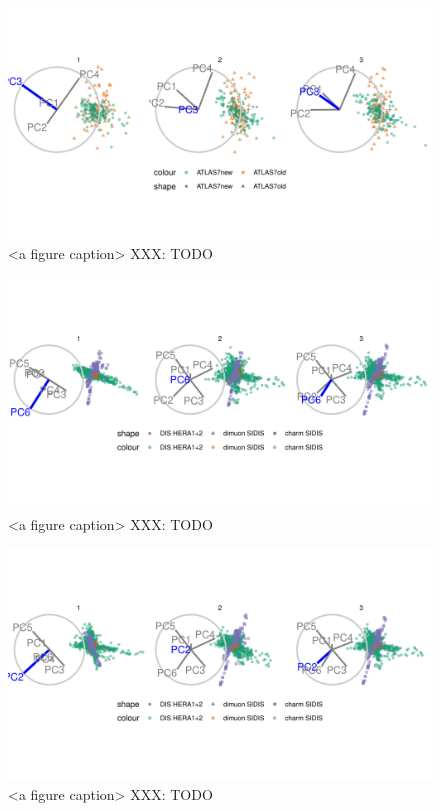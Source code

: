 \documentclass{monashthesis}
\begin{document}
\begin{figure}

{\centering \includegraphics[width=1\linewidth,]{./figures_from_script/ch3_fig5_jet_worse_pc3} 

}

\caption{<a figure caption> XXX: TODO}\label{fig:ch3fig5}
\end{figure}

\begin{figure}

{\centering \includegraphics[width=1\linewidth,]{./figures_from_script/ch3_fig6_DIS_better_pc6} 

}

\caption{<a figure caption> XXX: TODO}\label{fig:ch3fig6}
\end{figure}

\begin{figure}

{\centering \includegraphics[width=1\linewidth,]{./figures_from_script/ch3_fig7_DIS_worse_pc2} 

}

\caption{<a figure caption> XXX: TODO}\label{fig:ch3fig7}
\end{figure}
\end{document}
